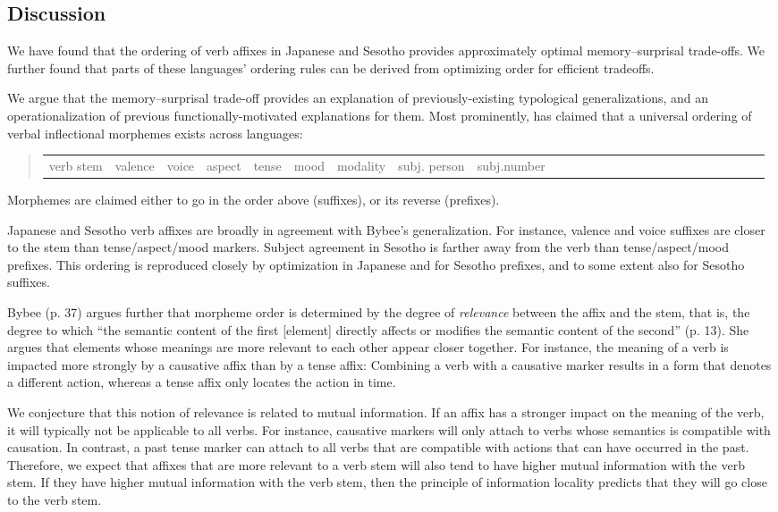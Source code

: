 \subsection{Discussion}
We have found that the ordering of verb affixes in Japanese and Sesotho provides approximately optimal memory--surprisal trade-offs.
We further found that parts of these languages' ordering rules can be derived from optimizing order for efficient tradeoffs.

We argue that the memory--surprisal trade-off provides an explanation of previously-existing typological generalizations, and an operationalization of previous functionally-motivated explanations for them.
Most prominently, \citet{bybee-morphology-1985} has claimed that a universal ordering of verbal inflectional morphemes exists across languages:
\begin{quote}
\begin{tabular}{llllllllllllllllllllllllll}
verb stem & valence & voice & aspect & tense& mood & modality & subj. person & subj.number 
\end{tabular}
\end{quote}
Morphemes are claimed either to go in the order above (suffixes), or its reverse (prefixes).

Japanese and Sesotho verb affixes are broadly in agreement with Bybee's generalization.
For instance, valence and voice suffixes are closer to the stem than tense/aspect/mood markers.
Subject agreement in Sesotho is farther away from the verb than tense/aspect/mood prefixes.
This ordering is reproduced closely by optimization in Japanese and for Sesotho prefixes, and to some extent also for Sesotho suffixes.

Bybee (p. 37) argues further that morpheme order is determined by the degree of \emph{relevance} between the affix and the stem, that is, the degree to which ``the semantic content of the first [element] directly affects or modifies the semantic content of the second'' (p. 13).
She argues that elements whose meanings are more relevant to each other appear closer together.
For instance, the meaning of a verb is impacted more strongly by a causative affix than by a tense affix:
Combining a verb with a causative marker results in a form that denotes a different action, whereas a tense affix only locates the action in time.

We conjecture that this notion of relevance is related to mutual information.
If an affix has a stronger impact on the meaning of the verb, it will typically not be applicable to all verbs.
For instance, causative markers will only attach to verbs whose semantics is compatible with causation.
In contrast, a past tense marker can attach to all verbs that are compatible with actions that can have occurred in the past.
Therefore, we expect that affixes that are more relevant to a verb stem will also tend to have higher mutual information with the verb stem.
If they have higher mutual information with the verb stem, then the principle of information locality predicts that they will go close to the verb stem.
